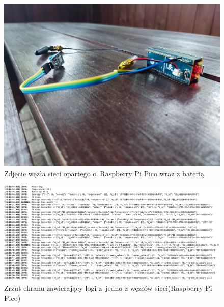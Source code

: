 \begin{figure}[b!]
    \begin{center}
        \includegraphics[width=13cm]{pic/wezel1.jpg}
    \end{center}
    \caption{Zdjęcie węzła sieci opartego o~Raspberry Pi Pico wraz z baterią}\label{rys:wezel1}
\end{figure}

\begin{figure}[b!]
    \begin{center}
        \includegraphics[width=13cm]{pic/logi-pico.png}
    \end{center}
    \caption{Zrzut ekranu zawierający logi z~jedno z węzłów sieci(Raspberry Pi Pico)}\label{rys:logi-pico}
\end{figure}

